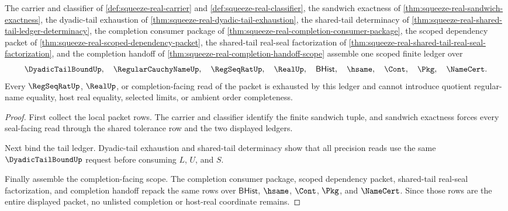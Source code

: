 \begin{theorem}
\label{thm:squeeze-real-scoped-tail-ledger-package}
The carrier and classifier of \autoref{def:squeeze-real-carrier} and \autoref{def:squeeze-real-classifier}, the sandwich exactness of \autoref{thm:squeeze-real-sandwich-exactness}, the dyadic-tail exhaustion of \autoref{thm:squeeze-real-dyadic-tail-exhaustion}, the shared-tail determinacy of \autoref{thm:squeeze-real-shared-tail-ledger-determinacy}, the completion consumer package of \autoref{thm:squeeze-real-completion-consumer-package}, the scoped dependency packet of \autoref{thm:squeeze-real-scoped-dependency-packet}, the shared-tail real-seal factorization of \autoref{thm:squeeze-real-shared-tail-real-seal-factorization}, and the completion handoff of \autoref{thm:squeeze-real-completion-handoff-scope} assemble one scoped finite ledger over
$$
\DyadicTailBoundUp,\quad \RegularCauchyNameUp,\quad \RegSeqRatUp,\quad \RealUp,\quad \mathsf{BHist},\quad \hsame,\quad \Cont,\quad \Pkg,\quad \NameCert.
$$
Every $\RegSeqRatUp$, $\RealUp$, or completion-facing read of the packet is exhausted by this ledger and cannot introduce quotient regular-name equality, host real equality, selected limits, or ambient order completeness.
\end{theorem}
\begin{proof}
First collect the local packet rows. The carrier and classifier identify the finite sandwich tuple, and sandwich exactness forces every seal-facing read through the shared tolerance row and the two displayed ledgers.

Next bind the tail ledger. Dyadic-tail exhaustion and shared-tail determinacy show that all precision reads use the same $\DyadicTailBoundUp$ request before consuming $L$, $U$, and $S$.

Finally assemble the completion-facing scope. The completion consumer package, scoped dependency packet, shared-tail real-seal factorization, and completion handoff repack the same rows over $\mathsf{BHist}$, $\hsame$, $\Cont$, $\Pkg$, and $\NameCert$. Since those rows are the entire displayed packet, no unlisted completion or host-real coordinate remains.
\end{proof}


